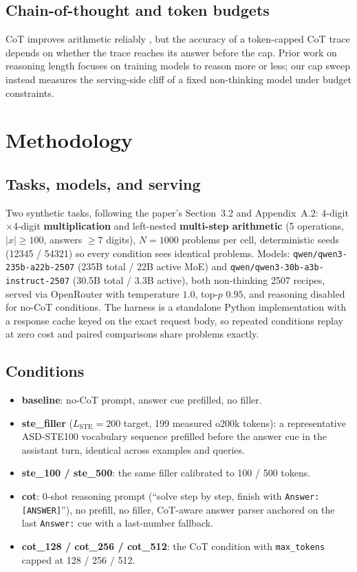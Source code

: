 \documentclass[11pt,a4paper]{article}
\begin{document}
\subsection{Chain-of-thought and token budgets}
CoT improves arithmetic reliably \citep{wei2022cot}, but the accuracy of a
token-capped CoT trace depends on whether the trace reaches its answer
before the cap. Prior work on reasoning length \citep{madaan2024learning}
focuses on training models to reason more or less; our cap sweep instead
measures the serving-side cliff of a fixed non-thinking model under budget
constraints.

\section{Methodology}
\label{sec:method}

\subsection{Tasks, models, and serving}
Two synthetic tasks, following the paper's Section~3.2 and Appendix~A.2:
4-digit$\times$4-digit \textbf{multiplication} and left-nested
\textbf{multi-step arithmetic} (5 operations, $|x| \geq 100$, answers
$\geq 7$ digits), $N{=}1000$ problems per cell, deterministic seeds (12345 /
54321) so every condition sees identical problems. Models:
\texttt{qwen/qwen3-235b-a22b-2507} (235B total / 22B active MoE) and
\texttt{qwen/qwen3-30b-a3b-instruct-2507} (30.5B total / 3.3B active), both
non-thinking 2507 recipes, served via OpenRouter with temperature $1.0$,
top-$p$ $0.95$, and reasoning disabled for no-CoT conditions. The harness is a
standalone Python implementation with a response cache keyed on the exact
request body, so repeated conditions replay at zero cost and paired
comparisons share problems exactly.

\subsection{Conditions}
\begin{itemize}
    \item \textbf{baseline}: no-CoT prompt, answer cue prefilled, no filler.
    \item \textbf{ste\_filler} ($L_{\mathrm{STE}}{=}200$ target, 199 measured
    o200k tokens): a representative ASD-STE100 vocabulary sequence prefilled
    before the answer cue in the assistant turn, identical across examples and
    queries.
    \item \textbf{ste\_100 / ste\_500}: the same filler calibrated to
    100 / 500 tokens.
    \item \textbf{cot}: 0-shot reasoning prompt (``solve step by step, finish
    with \texttt{Answer: [ANSWER]}''), no prefill, no filler, CoT-aware answer
    parser anchored on the last \texttt{Answer:} cue with a
    last-number fallback.
    \item \textbf{cot\_128 / cot\_256 / cot\_512}: the CoT condition with
    \texttt{max\_tokens} capped at 128 / 256 / 512.
\end{itemize}
\end{document}
